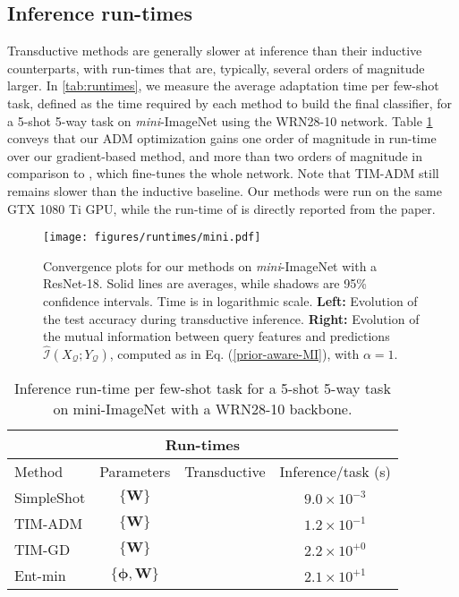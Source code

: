 \documentclass{article}
\newcommand{\cmark}{\ding{51}}\newcommand{\xmark}{\ding{55}}\newcommand{\CC}{\mathcal{C}}
\begin{document}
    \subsection{Inference run-times}
        Transductive methods are generally slower at inference than their inductive counterparts, with run-times that are, typically, several orders of magnitude larger. In \autoref{tab:runtimes}, we measure the average adaptation time per few-shot task, defined as the time required by each method to build the final classifier, for a 5-shot 5-way task on \textit{mini}-ImageNet using the WRN28-10 network. Table \ref{tab:runtimes} conveys that our ADM optimization gains one order of magnitude in run-time over our gradient-based method, and more than two orders of magnitude in comparison to \cite{dhillon2019baseline}, which fine-tunes the whole network. Note that TIM-ADM still remains slower than the inductive baseline. Our methods were run on the same GTX 1080 Ti GPU, while the run-time of \cite{dhillon2019baseline} is directly reported from the paper. 



\begin{figure}[t]
            \centering
            \texttt{[image: figures/runtimes/mini.pdf]}
            \caption{Convergence plots for our methods on \textit{mini}-ImageNet with a ResNet-18. Solid lines are averages, while shadows are 95\% confidence intervals. Time is in logarithmic scale. \textbf{Left:} Evolution of the test accuracy during transductive inference. \textbf{Right:} Evolution of the mutual information between query features and predictions $\widehat{\mathcal{I}}(X_\mathcal{Q};Y_\mathcal{Q})$, computed as in Eq. (\ref{prior-aware-MI}), with $\alpha=1$.}
            \label{fig:convergence_methods}
        \end{figure}
        
        \begin{table}[t]
            \centering
                \begin{tabular}{lccc}
                    \multicolumn{4}{c}{\textbf{Run-times}} \\
                    \toprule
                    Method & Parameters & Transductive & Inference/task (s) \\
                    \toprule
                    SimpleShot \cite{simpleshot}& $\{\textbf{W}\}$ & \xmark & $9.0 \times 10^{-3}$ \\
                    \midrule
\rowcolor{Gray} TIM-ADM & $\{\textbf{W}\}$ & & $1.2 \times 10^{-1}$\\
                    \rowcolor{Gray} TIM-GD & $\{\textbf{W}\}$ & & $2.2 \times 10^{+0}$\\
                    Ent-min \cite{dhillon2019baseline} & $\{\boldsymbol{\phi}, \textbf{W}\}$ & \multirow{-4}{*}{\cmark} & $2.1 \times 10^{+1}$ \\
                    \bottomrule
                \end{tabular}
            \caption{Inference run-time per few-shot task for a 5-shot 5-way task on mini-ImageNet with a WRN28-10 backbone.}
            \label{tab:runtimes}
        \end{table}
\end{document}

